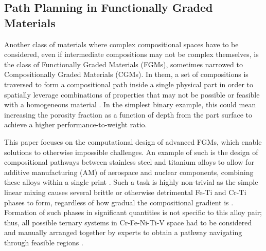 \subsection{Path Planning in Functionally Graded Materials} \label{nimplex:ssec:functionallygraded}

Another class of materials where complex compositional spaces have to be considered, even if intermediate compositions may not be complex themselves, is the class of Functionally Graded Materials (FGMs), sometimes narrowed to Compositionally Graded Materials (CGMs). In them, a set of compositions is traversed to form a compositional path inside a single physical part in order to spatially leverage combinations of properties that may not be possible or feasible with a homogeneous material \cite{Saleh202030Challenges}. In the simplest binary example, this could mean increasing the porosity fraction as a function of depth from the part surface to achieve a higher performance-to-weight ratio. 

This paper focuses on the computational design of advanced FGMs, which enable solutions to otherwise impossible challenges. An example of such is the design of compositional pathways between stainless steel and titanium alloys to allow for additive manufacturing (AM) of aerospace and nuclear components, combining these alloys within a single print \cite{Bobbio2022DesignCompositions}. Such a task is highly non-trivial as the simple linear mixing causes several brittle or otherwise detrimental Fe-Ti and Cr-Ti phases to form, regardless of how gradual the compositional gradient is \cite{Reichardt2016DevelopmentManufacturing}. Formation of such phases in significant quantities is not specific to this alloy pair; thus, all possible ternary systems in Cr-Fe-Ni-Ti-V space had to be considered and manually arranged together by experts to obtain a pathway navigating through feasible regions \cite{Bobbio2022DesignCompositions}.


